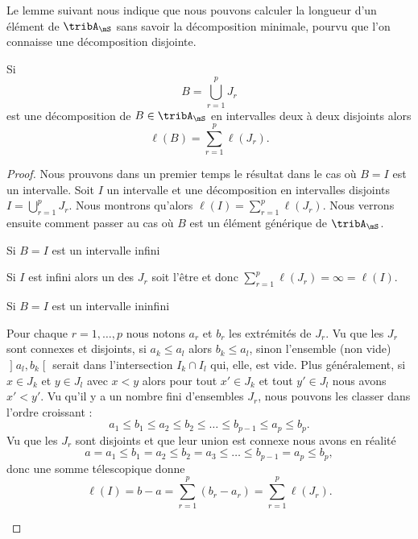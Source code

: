 Le lemme suivant nous indique que nous pouvons calculer la longueur d'un élément de \( \tribA_{\mS}\) sans savoir la décomposition minimale, pourvu que l'on connaisse une décomposition disjointe.
\begin{lemma}\label{LemIUQooEzHun}
    Si
    \begin{equation}
        B=\bigcup_{r=1}^pJ_r
    \end{equation}
    est une décomposition de \( B\in\tribA_{\mS}\) en intervalles deux à deux disjoints alors
    \begin{equation}
        \ell(B)=\sum_{r=1}^p\ell(J_r).
    \end{equation}
\end{lemma}

\begin{proof}
    Nous prouvons dans un premier temps le résultat dans le cas où \( B=I\) est un intervalle. Soit \( I\) un intervalle et une décomposition en intervalles disjoints \( I=\bigcup_{r=1}^pJ_r\). Nous montrons qu'alors \( \ell(I)=\sum_{r=1}^p\ell(J_r)\). Nous verrons ensuite comment passer au cas où \( B\) est un élément générique de \( \tribA_{\mS}\).
    \begin{subproof}
    \item[Si \( B=I\) est un intervalle infini]

        Si \( I\) est infini alors un des \( J_r\) soit l'être et donc \( \sum_{r=1}^p\ell(J_r)=\infty=\ell(I)\).
    \item[Si \( B=I\) est un intervalle ininfini]

    Pour chaque \( r=1,\ldots, p\) nous notons \( a_r\) et \( b_r\) les extrémités de \( J_r\). Vu que les \( J_r\) sont connexes et disjoints, si \( a_k\leq a_l\) alors \( b_k\leq a_l\), sinon l'ensemble (non vide) \( \mathopen] a_l , b_k \mathclose[ \) serait dans l'intersection \( I_k\cap I_l\) qui, elle, est vide. Plus généralement, si \( x\in J_k\) et \( y\in J_l\) avec \( x<y\) alors pour tout \( x'\in J_k\) et tout \( y'\in J_l\) nous avons \( x'<y'\). Vu qu'il y a un nombre fini d'ensembles \( J_r\), nous pouvons les classer dans l'ordre croissant :
        \begin{equation}
            a_1\leq b_1\leq a_2\leq b_2\leq \ldots\leq b_{p-1}\leq a_p\leq b_p.
        \end{equation}
        Vu que les \( J_r\) sont disjoints et que leur union est connexe nous avons en réalité
        \begin{equation}
            a=a_1\leq b_1=a_2\leq b_2=a_3\leq\ldots\leq b_{p-1}= a_p\leq b_p,
        \end{equation}
        donc une somme télescopique donne
        \begin{equation}
            \ell(I)=b-a=\sum_{r=1}^p(b_r-a_r)=\sum_{r=1}^p\ell(J_r).
        \end{equation}


\end{subproof}
\end{proof}
